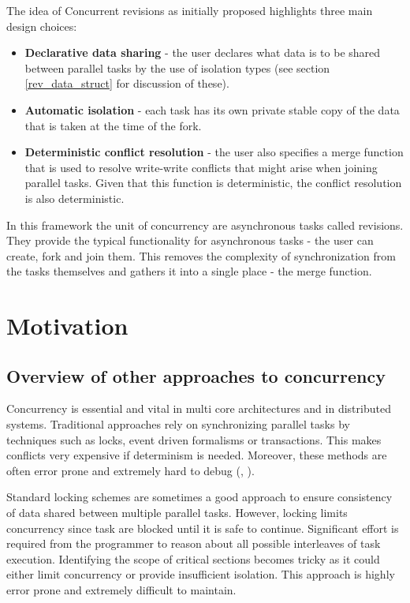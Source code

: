 \documentclass[12pt,twoside,notitlepage]{report}
\begin{document}
The idea of Concurrent revisions as initially proposed highlights three main design choices:
\begin{itemize}
\item {\bfseries Declarative data sharing} - the user declares what data is to be shared between parallel tasks by the use of isolation types (see section \ref{rev_data_struct} for discussion of these).  
 
\item {\bfseries Automatic isolation} - each task has its own private stable copy of the data that is taken at the time of the fork.

\item {\bfseries Deterministic conflict resolution} - the user also specifies a merge function that is used to resolve write-write conflicts that might arise when joining parallel tasks. Given that this function is deterministic, the conflict resolution is also deterministic.

\end{itemize}

In this framework the unit of concurrency are asynchronous tasks called revisions. They provide the typical functionality for asynchronous tasks - the user can create, fork and join them. This removes the complexity of synchronization from the tasks themselves and gathers it into a single place - the merge function. 

\section{Motivation}

\subsection{Overview of other approaches to concurrency}
 
Concurrency is essential and vital in multi core architectures and in distributed systems. Traditional approaches rely on synchronizing parallel tasks by techniques such as locks, event driven formalisms or transactions. This makes conflicts very expensive if determinism is needed. Moreover, these methods are often error prone and extremely hard to debug (\cite{bacon}, \cite{transactions}).

Standard locking schemes are sometimes a good approach to ensure consistency of data shared between multiple parallel tasks. However, locking limits concurrency since task are blocked until it is safe to continue. Significant effort is required from the programmer to reason about all possible interleaves of task execution. Identifying the scope of critical sections becomes tricky as it could either limit concurrency or provide insufficient isolation. This approach is highly error prone and extremely difficult to maintain.
\end{document}
